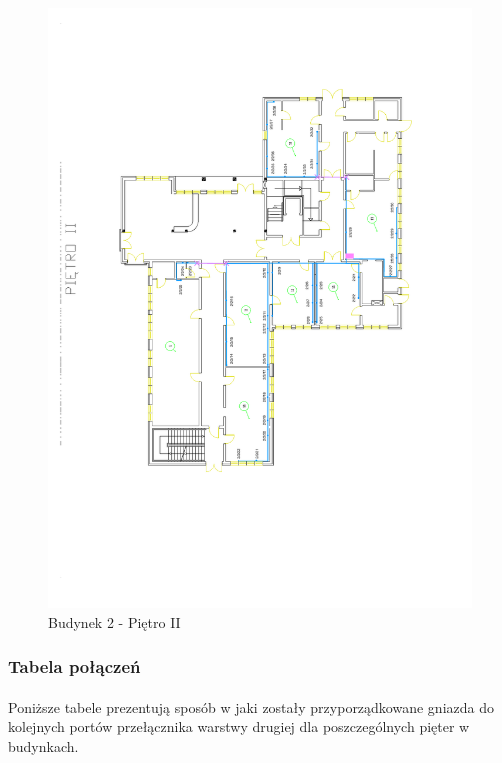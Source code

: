 \begin{figure}[H]
  \begin{center}
    \includegraphics[width=\textwidth]{img/s/b2-2.pdf}
    \caption{Budynek 2 - Piętro II}
  \end{center}
\end{figure}


\subsubsection{Tabela połączeń}
\paragraph{}
Poniższe tabele prezentują sposób w jaki zostały przyporządkowane gniazda do kolejnych portów przełącznika warstwy drugiej dla poszczególnych pięter w budynkach.


